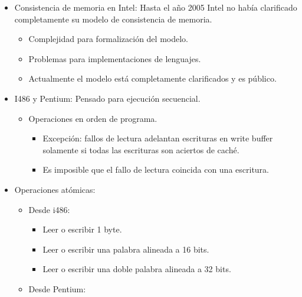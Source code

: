 \documentclass[12pt, twoside, openright]{report} %
\begin{document}
\begin{itemize}

	\item Consistencia de memoria en Intel: Hasta el año 2005 Intel no
	      había clarificado completamente su modelo de consistencia de
	      memoria.

	      \begin{itemize}

		      \item Complejidad para formalización del modelo.
		      \item Problemas para implementaciones de lenguajes.
		      \item Actualmente el modelo está completamente clarificados y es
		            público.
	      \end{itemize}
	\item I486 y Pentium: Pensado para ejecución secuencial.

	      \begin{itemize}

		      \item Operaciones en orden de programa.

		            \begin{itemize}

			            \item Excepción: fallos de lectura adelantan escrituras en write
			                  buffer solamente si todas las escrituras son aciertos de
			                  caché.
			            \item Es imposible que el fallo de lectura coincida con una
			                  escritura.
		            \end{itemize}
	      \end{itemize}
	\item Operaciones atómicas:

	      \begin{itemize}

		      \item Desde i486:

		            \begin{itemize}

			            \item Leer o escribir 1 byte.
			            \item Leer o escribir una palabra alineada a 16 bits.
			            \item Leer o escribir una doble palabra alineada a 32 bits.
		            \end{itemize}
		      \item Desde Pentium:


\end{itemize}
\end{itemize}
\end{document}
